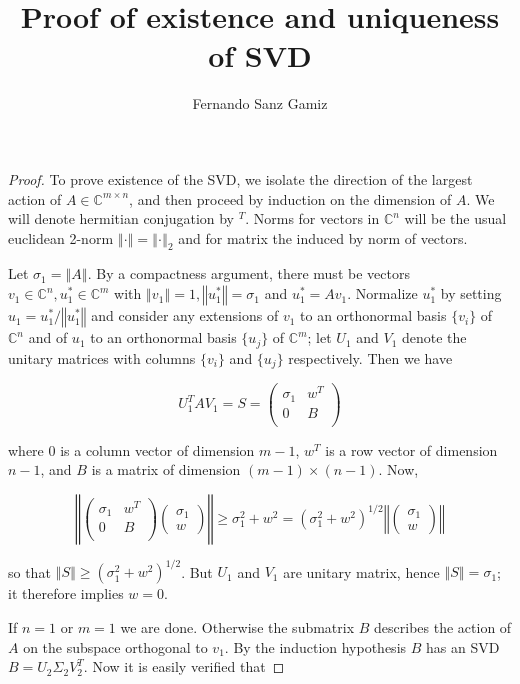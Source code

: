 \documentclass[12pt]{article}
\newcommand{\norm}[1]{\left\Vert#1\right\Vert}
\newcommand{\C}{\mathbb C}
\begin{document}
\title{Proof of existence and uniqueness of SVD}%
\author{Fernando Sanz Gamiz}%

\begin{proof}
To prove existence of the SVD, we isolate the direction of the
largest action of $A \in \C^{m \times n}$, and then proceed by induction on the dimension
of $A$. We will denote hermitian conjugation by $^T$. Norms for
vectors in $\C^n$ will be the usual euclidean 2-norm $\norm{\cdot
}=\norm{\cdot}_2$ and for matrix the induced by norm of vectors.


Let $\sigma_1=\norm{A}$. By a compactness argument, there must be
vectors $v_1 \in \C^n, u^*_1 \in \C^m$ with $\norm{v_1}=1,
\norm{u^*_1}=\sigma_1$ and $u^*_1=Av_1$. Normalize $u^*_1$ by
setting $u_1=u^*_1 / \norm{u^*_1}$ and consider any extensions of
$v_1$ to an orthonormal basis $\{v_i\}$ of $\C^n$ and of $u_1$ to an
orthonormal basis $\{u_j\}$ of $\C^m$; let $U_1$ and $V_1$ denote
the unitary matrices with columns $\{v_i\}$ and $\{u_j\}$
respectively. Then we have

$$U^T_1AV_1=S=\left( \begin{array}{cc}
\sigma_1 & w^T \\
0 & B \\
\end{array} \right)$$

\noindent where $0$ is a column vector of dimension $m-1$, $w^T$ is
a row vector of dimension $n-1$, and $B$ is a matrix of dimension
$(m-1) \times (n-1)$. Now,

$$\norm{\left( \begin{array}{cc}
\sigma_1 & w^T \\
0 & B \\
\end{array} \right) \left( \begin{array}{c}
\sigma_1 \\ w \end{array} \right) } \geq
\sigma_1^2+w^2=(\sigma_1^2+w^2)^{1/2} \norm{\left( \begin{array}{c}
\sigma_1 \\ w \end{array} \right)} $$


\noindent so that $\norm{S} \geq (\sigma_1^2+w^2)^{1/2}$. But $U_1$
and $V_1$ are unitary matrix, hence $\norm{S}=\sigma_1$; it
therefore implies $w=0$.

\noindent If $n=1$ or $m=1$ we are done. Otherwise the submatrix $B$
describes the action of $A$ on the subspace orthogonal to $v_1$. By
the induction hypothesis $B$ has an SVD $B=U_2 \Sigma_2 V^T_2$. Now it
is easily verified that


\end{proof}
\end{document}
